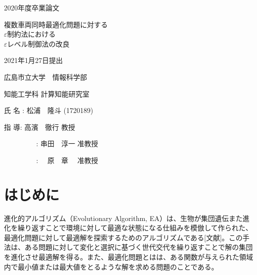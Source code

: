 \documentclass[a4paper,12pt]{jsreport}
\begin{document}
\begin{titlepage}

    {\Large 2020年度卒業論文}

    \begin{center}

        \vspace{10truept}

        \vspace*{120truept}

        {\Huge 複数車両同時最適化問題に対する\\$\varepsilon$制約法における\\$\varepsilon$レベル制御法の改良} 
        
        \vspace{100truept}
        
        {\Large 2021年1月27日提出}

        \vspace{50truept}

        {\Large 広島市立大学　情報科学部}
        
        {\Large 知能工学科  計算知能研究室}

        \vspace{10truept}

        {\Large 氏 名   :     松浦　隆斗 (1720189)}

        \vspace{70truept}

        {\Large 指 導: 高濱　徹行  教授}
        
        {\Large \,\ \ \ \ \ \ \ \ \ : 串田　淳一  准教授}
        
        {\Large \,\ \ \ \ \ \ \ \ \ : 　原　章  　准教授}
        
        \vspace{10truept}

    \end{center}
\end{titlepage}

\tableofcontents




\chapter{はじめに}
進化的アルゴリズム（Evolutionary Algorithm, EA）は、生物が集団遺伝また進化を繰り返すことで環境に対して最適な状態になる仕組みを模倣して作られた、最適化問題に対して最適解を探索するためのアルゴリズムである[文献]。この手法は、ある問題に対して変化と選択に基づく世代交代を繰り返すことで解の集団を進化させ最適解を得る。また、最適化問題とはは、ある関数が与えられた領域内で最小値または最大値をとるような解を求める問題のことである。
\end{document}
